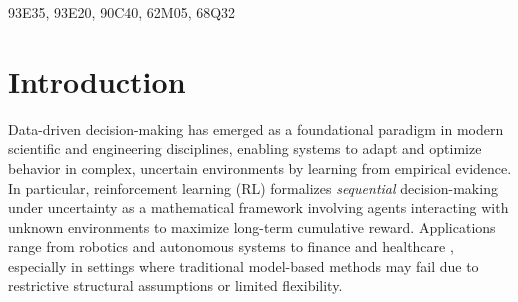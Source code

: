 \documentclass[final,supplement]{siamart251216}
\begin{document}
\begin{MSCcodes}
93E35, 93E20, 90C40, 62M05, 68Q32
\end{MSCcodes}


\section{Introduction}



Data-driven decision-making has emerged as a foundational paradigm in modern scientific and engineering disciplines, enabling systems to adapt and optimize behavior in complex, uncertain environments by learning from empirical evidence. In particular, reinforcement learning (RL)  formalizes {\it sequential} decision-making under uncertainty as a mathematical framework involving agents interacting with unknown environments to maximize long-term cumulative reward. Applications range from robotics \cite{kober2013reinforcement,zhao2020sim} and autonomous systems \cite{kiran2021deep,shalev2016safe} to finance \cite{hambly2023recent} and healthcare \cite{yu2021reinforcement}, especially in settings where traditional model-based methods may fail due to restrictive structural assumptions or limited flexibility.
\end{document}

